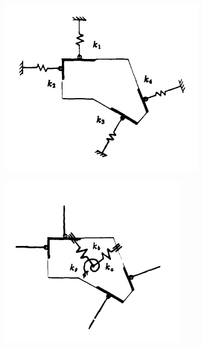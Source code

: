 \begin{figure}

    \begin{subfigure}{0.31\textwidth}
      \includegraphics[width=\linewidth]{figures/graspA.png}
      \caption{} \label{fig:1a}
    \end{subfigure}%
    \hspace*{\fill}   %
    \begin{subfigure}{0.31\textwidth}
      \includegraphics[width=\linewidth]{figures/graspB.png}

\end{subfigure}
\end{figure}
